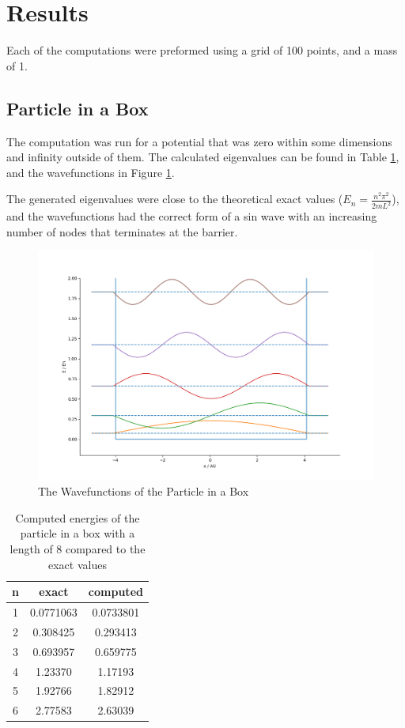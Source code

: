 \documentclass{article}
\begin{document}
\section*{Results}

Each of the computations were preformed using a grid of 100 points, and a mass of 1.

\newpage
\subsection*{Particle in a Box}

The computation was run for a potential that was zero within some dimensions and infinity outside of them. The calculated eigenvalues can be found in Table \ref{tab:pib}, and the wavefunctions in Figure \ref{fig:pib}. 

The generated eigenvalues were close to the theoretical exact values ($E_n=\frac{n^2\pi^2}{2mL^2}$), and the wavefunctions had the correct form of a sin wave with an increasing number of nodes that terminates at the barrier.

\begin{figure}[h]
\centering
	\includegraphics[width=.75\linewidth]{images/pib.png}
	\caption{The Wavefunctions of the Particle in a Box}
	\label{fig:pib}
\end{figure}

\begin{table}[h]
\centering
\begin{tabular}{ |c|c|c|}
\hline
n & exact & computed \\
\hline
1 & 0.0771063 & 0.0733801 \\
2 & 0.308425 & 0.293413 \\
3 & 0.693957 & 0.659775\\
4 & 1.23370 & 1.17193\\
5 & 1.92766 & 1.82912\\
6 & 2.77583 & 2.63039\\
\hline
\end{tabular}
\caption{Computed energies of the particle in a box with a length of 8 compared to the exact values}
\label{tab:pib}
\end{table}
\end{document}
